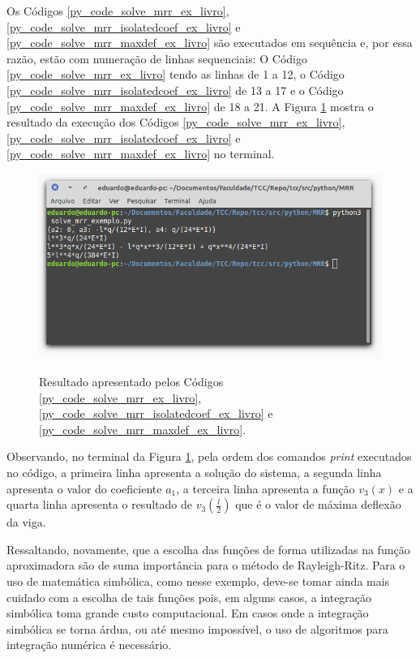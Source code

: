 \documentclass[
	12pt,				%
	openright,			%
    twoside,			%
	a4paper,			%
	english,			%
	french,				%
	spanish,			%
	brazil				%
	]{abntex2}
\numberwithin{lema}{chapter}
\numberwithin{teorema}{chapter}
\numberwithin{definicao}{chapter}
\numberwithin{exemplo}{chapter}
\numberwithin{figure}{chapter}
\begin{document}
Os Códigos \ref{py_code_solve_mrr_ex_livro}, \ref{py_code_solve_mrr_isolatedcoef_ex_livro} e \ref{py_code_solve_mrr_maxdef_ex_livro} são executados em sequência e, por essa razão, estão com numeração de linhas sequenciais: O Código \ref{py_code_solve_mrr_ex_livro} tendo as linhas de 1 a 12, o Código \ref{py_code_solve_mrr_isolatedcoef_ex_livro} de 13 a 17 e o Código \ref{py_code_solve_mrr_maxdef_ex_livro} de 18 a 21. A Figura \ref{fig:code_solve_mrr_exec_complete} mostra o resultado da execução dos Códigos \ref{py_code_solve_mrr_ex_livro}, \ref{py_code_solve_mrr_isolatedcoef_ex_livro} e \ref{py_code_solve_mrr_maxdef_ex_livro} no terminal.

\begin{figure}[h]
	\caption{Resultado apresentado pelos Códigos \ref{py_code_solve_mrr_ex_livro}, \ref{py_code_solve_mrr_isolatedcoef_ex_livro} e \ref{py_code_solve_mrr_maxdef_ex_livro}.}
	\centering
	\includegraphics[scale=2]{../figuras/code/code_solve_mrr_exec_complete.png}
	\label{fig:code_solve_mrr_exec_complete}
\end{figure}

Observando, no terminal da Figura \ref{fig:code_solve_mrr_exec_complete}, pela ordem dos comandos \textit{print} executados no código, a primeira linha apresenta a solução do sistema, a segunda linha apresenta o valor do coeficiente $a_1$, a terceira linha apresenta a função $v_3(x)$ e a quarta linha apresenta o resultado de $v_3(\frac{l}{2})$ que é o valor de máxima deflexão da viga.

Ressaltando, novamente, que a escolha das funções de forma utilizadas na função aproximadora são de suma importância para o método de Rayleigh-Ritz. Para o uso de matemática simbólica, como nesse exemplo, deve-se tomar ainda mais cuidado com a escolha de tais funções pois, em alguns casos, a integração simbólica toma grande custo computacional. Em casos onde a integração simbólica se torna árdua, ou até mesmo impossível, o uso de algoritmos para integração numérica é necessário.
\end{document}
